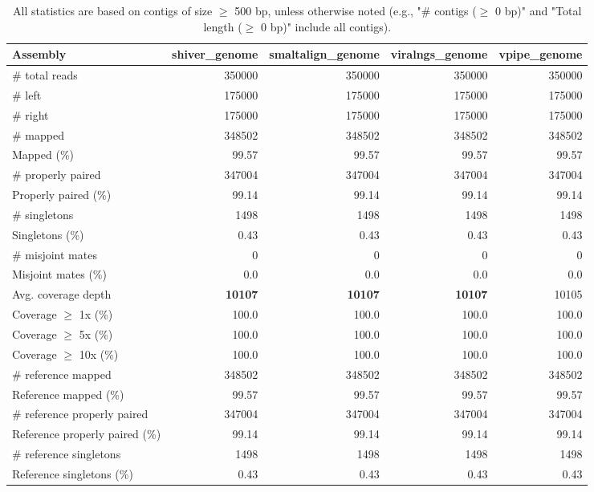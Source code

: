 \documentclass[12pt,a4paper]{article}
\begin{document}
\begin{table}[ht]
\begin{center}
\caption{All statistics are based on contigs of size $\geq$ 500 bp, unless otherwise noted (e.g., "\# contigs ($\geq$ 0 bp)" and "Total length ($\geq$ 0 bp)" include all contigs).}
\begin{tabular}{|l*{4}{|r}|}
\hline
Assembly & shiver\_genome & smaltalign\_genome & viralngs\_genome & vpipe\_genome \\ \hline
\# total reads & 350000 & 350000 & 350000 & 350000 \\ \hline
\# left & 175000 & 175000 & 175000 & 175000 \\ \hline
\# right & 175000 & 175000 & 175000 & 175000 \\ \hline
\# mapped & 348502 & 348502 & 348502 & 348502 \\ \hline
Mapped (\%) & 99.57 & 99.57 & 99.57 & 99.57 \\ \hline
\# properly paired & 347004 & 347004 & 347004 & 347004 \\ \hline
Properly paired (\%) & 99.14 & 99.14 & 99.14 & 99.14 \\ \hline
\# singletons & 1498 & 1498 & 1498 & 1498 \\ \hline
Singletons (\%) & 0.43 & 0.43 & 0.43 & 0.43 \\ \hline
\# misjoint mates & 0 & 0 & 0 & 0 \\ \hline
Misjoint mates (\%) & 0.0 & 0.0 & 0.0 & 0.0 \\ \hline
Avg. coverage depth & {\bf 10107} & {\bf 10107} & {\bf 10107} & 10105 \\ \hline
Coverage $\geq$ 1x (\%) & 100.0 & 100.0 & 100.0 & 100.0 \\ \hline
Coverage $\geq$ 5x (\%) & 100.0 & 100.0 & 100.0 & 100.0 \\ \hline
Coverage $\geq$ 10x (\%) & 100.0 & 100.0 & 100.0 & 100.0 \\ \hline
\# reference mapped & 348502 & 348502 & 348502 & 348502 \\ \hline
Reference mapped (\%) & 99.57 & 99.57 & 99.57 & 99.57 \\ \hline
\# reference properly paired & 347004 & 347004 & 347004 & 347004 \\ \hline
Reference properly paired (\%) & 99.14 & 99.14 & 99.14 & 99.14 \\ \hline
\# reference singletons & 1498 & 1498 & 1498 & 1498 \\ \hline
Reference singletons (\%) & 0.43 & 0.43 & 0.43 & 0.43 \\ \hline

\end{tabular}
\end{center}
\end{table}
\end{document}
